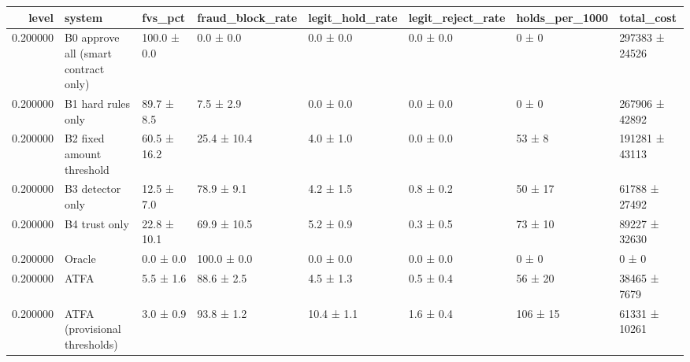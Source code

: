 \begin{tabular}{rlllllll}
\toprule
level & system & fvs\_pct & fraud\_block\_rate & legit\_hold\_rate & legit\_reject\_rate & holds\_per\_1000 & total\_cost \\
\midrule
0.200000 & B0 approve all (smart contract only) & 100.0 ± 0.0 & 0.0 ± 0.0 & 0.0 ± 0.0 & 0.0 ± 0.0 & 0 ± 0 & 297383 ± 24526 \\
0.200000 & B1 hard rules only & 89.7 ± 8.5 & 7.5 ± 2.9 & 0.0 ± 0.0 & 0.0 ± 0.0 & 0 ± 0 & 267906 ± 42892 \\
0.200000 & B2 fixed amount threshold & 60.5 ± 16.2 & 25.4 ± 10.4 & 4.0 ± 1.0 & 0.0 ± 0.0 & 53 ± 8 & 191281 ± 43113 \\
0.200000 & B3 detector only & 12.5 ± 7.0 & 78.9 ± 9.1 & 4.2 ± 1.5 & 0.8 ± 0.2 & 50 ± 17 & 61788 ± 27492 \\
0.200000 & B4 trust only & 22.8 ± 10.1 & 69.9 ± 10.5 & 5.2 ± 0.9 & 0.3 ± 0.5 & 73 ± 10 & 89227 ± 32630 \\
0.200000 & Oracle & 0.0 ± 0.0 & 100.0 ± 0.0 & 0.0 ± 0.0 & 0.0 ± 0.0 & 0 ± 0 & 0 ± 0 \\
0.200000 & ATFA & 5.5 ± 1.6 & 88.6 ± 2.5 & 4.5 ± 1.3 & 0.5 ± 0.4 & 56 ± 20 & 38465 ± 7679 \\
0.200000 & ATFA (provisional thresholds) & 3.0 ± 0.9 & 93.8 ± 1.2 & 10.4 ± 1.1 & 1.6 ± 0.4 & 106 ± 15 & 61331 ± 10261 \\
\bottomrule
\end{tabular}
